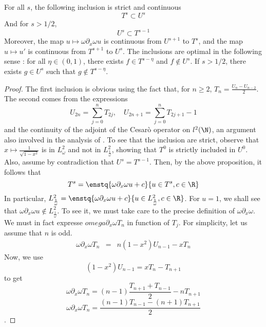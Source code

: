 \documentclass[]{article}
\begin{document}
\begin{Prop}
	For all $s$, the following inclusion is strict and continuous 
	\[ T^s \subset U^s\]
	And for $s > 1/2$, 
	\[ U^s \subset T^{s-1}\]
	Moreover, the map $u \mapsto \omega\partial_x\omega u$ is continuous from $U^{s+1}$ to $T^s$, and the map $u \mapsto u'$ is continuous from $T^{s+1}$ to $U^s$. 
	The inclusions are optimal in the following sense : for all $\eta \in (0,1)$, there exists $f \in T^{s-\eta}$ and $f\notin U^s$. If $s > 1/2$,  there exists $g \in U^s$ such that $g\notin T^{s-\eta}$.  
	\begin{proof}
		The first inclusion is obvious using the fact that, for $n \geq 2$, $T_n = \frac{U_n - U_{n-2}}{2}$. The second comes from the expressions
		\[U_{2n} = \sum_{j = 0}^n T_{2j}, \quad U_{2n+1} = \sum_{j=0}^n T_{2j+1} - 1\]
		and the continuity of the adjoint of the Cesarò operator on $l^2(\N)$, an argument also involved in the analysis of \cite{bruno2012second}. To see that the inclusion are strict, observe that $x \mapsto \frac{1}{\sqrt{1-x^2}}$ is in $L^2_\omega$ and not in $L^2_\frac{1}{\omega}$, showing that $T^0$ is strictly included in $U^0$. Also, assume by contradiction that $U^s = T^{s-1}$. Then, by the above proposition, it follows that
		\[T^s = \enstq{\omega \partial_x \omega u + c}{u \in T^s, c \in \R}\]
		In particular, $L^2_\frac{1}{\omega} = \enstq{\omega \partial_x \omega u + c}{u \in L^2_\frac{1}{\omega}, c \in \R} $.  
		For $u=1$, we shall see that $\omega \partial_x \omega u \notin L^2_\frac{1}{\omega}$. To see it, we must take care to the precise definition of $\omega \partial_x \omega$. We must in fact expresse $omega \partial_x \omega T_n$ in function of $T_j$. For simplicity, let us assume that $n$ is odd.
		\begin{eqnarray*}
			\omega \partial_x \omega T_n &=& n(1-x^2)U_{n-1} - x T_n
		\end{eqnarray*}
		Now, we use
		\[(1-x^2)U_{n-1} = xT_n - T_{n+1}\]
		to get
		\[\omega \partial_x \omega T_n = (n-1)\frac{T_{n+1} + T_{n-1}}{2} - nT_{n+1}\]
		\[\omega \partial_x \omega T_n  = \frac{(n-1)T_{n-1} - (n+1)T_{n+1}}{2}\]
		.
	\end{proof}
\end{Prop}

\end{document}
